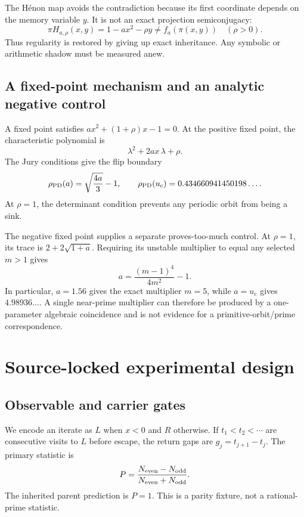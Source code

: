 \documentclass[11pt]{article}
\newcommand{\uc}{u_{\mathrm c}}
\begin{document}
The H\'enon map avoids the contradiction because its first coordinate depends
on the memory variable \(y\). It is not an exact projection semiconjugacy:
\[
 \pi H_{a,\rho}(x,y)=1-a x^2-\rho y\neq f_a(\pi(x,y))
 \quad(\rho>0).
\]
Thus regularity is restored by giving up exact inheritance. Any symbolic or
arithmetic shadow must be measured anew.

\subsection{A fixed-point mechanism and an analytic negative control}
\label{sec:fixed}

A fixed point satisfies \(a x^2+(1+\rho)x-1=0\). At the positive fixed
point, the characteristic polynomial is
\[
 \lambda^2+2ax\,\lambda+\rho.
\]
The Jury conditions give the flip boundary
\begin{equation}
\rho_{\rm PD}(a)=\sqrt{\frac{4a}{3}}-1,
\qquad
\rho_{\rm PD}(\uc)=0.434660941450198\ldots .
\label{eq:jury}
\end{equation}
At \(\rho=1\), the determinant condition prevents any periodic orbit from
being a sink.

The negative fixed point supplies a separate proves-too-much control. At
\(\rho=1\), its trace is \(2+2\sqrt{1+a}\). Requiring its unstable
multiplier to equal any selected \(m>1\) gives
\begin{equation}
 a=\frac{(m-1)^4}{4m^2}-1.
\label{eq:tunable}
\end{equation}
In particular, \(a=1.56\) gives the exact multiplier \(m=5\), while
\(a=\uc\) gives \(4.98936\ldots\). A single near-prime multiplier can
therefore be produced by a one-parameter algebraic coincidence and is not
evidence for a primitive-orbit/prime correspondence.

\section{Source-locked experimental design}
\label{sec:protocol}

\subsection{Observable and carrier gates}

We encode an iterate as \(L\) when \(x<0\) and \(R\) otherwise. If
\(t_1<t_2<\cdots\) are consecutive visits to \(L\) before escape, the return
gaps are \(g_j=t_{j+1}-t_j\). The primary statistic is
\begin{equation}
 P=\frac{N_{\rm even}-N_{\rm odd}}
         {N_{\rm even}+N_{\rm odd}}.
\label{eq:polarity}
\end{equation}
The inherited parent prediction is \(P=1\). This is a parity fixture, not a
rational-prime statistic.
\end{document}
